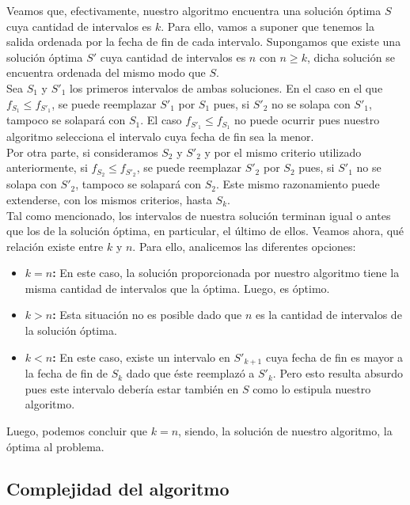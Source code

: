 Veamos que, efectivamente, nuestro algoritmo encuentra una solución óptima $S$ cuya cantidad de intervalos es $k$. Para ello, vamos a suponer que tenemos la salida ordenada por la fecha de fin de cada intervalo. Supongamos que existe una solución óptima $S'$ cuya cantidad de intervalos es $n$ con $n \geq k$, dicha solución se encuentra ordenada del mismo modo que $S$.\\ Sea $S_{1}$ y $S'_{1}$ los primeros intervalos de ambas soluciones. En el caso en el que $f_{S_{1}} \leq f_{S'_{1}}$, se puede reemplazar $S'_{1}$ por $S_{1}$ pues, si $S'_{2}$ no se solapa con $S'_{1}$, tampoco se solapará con $S_{1}$. El caso $f_{S'_{1}} \leq f_{S_{1}}$ no puede ocurrir pues nuestro algoritmo selecciona el intervalo cuya fecha de fin sea la menor.\\
Por otra parte, si consideramos $S_{2}$ y $S'_{2}$ y por el mismo criterio utilizado anteriormente, si $f_{S_{2}} \leq f_{S'_{2}}$, se puede reemplazar $S'_{2}$ por $S_{2}$ pues, si $S'_{1}$ no se solapa con $S'_{2}$, tampoco se solapará con $S_{2}$. Este mismo razonamiento puede extenderse, con los mismos criterios, hasta $S_{k}$.\\
Tal como mencionado, los intervalos de nuestra solución terminan igual o antes que los de la solución óptima, en particular, el último de ellos. Veamos ahora, qué relación existe entre $k$ y $n$. Para ello, analicemos las diferentes opciones:
\begin{itemize}
\item \textbf{$k = n$:} En este caso, la solución proporcionada por nuestro algoritmo tiene la misma cantidad de intervalos que la óptima. Luego, es óptimo.
\item \textbf{$k > n$:} Esta situación no es posible dado que $n$ es la cantidad de intervalos de la solución óptima.
\item \textbf{$k < n$:} En este caso, existe un intervalo en $S'_{k+1}$ cuya fecha de fin es mayor a la fecha de fin de $S_{k}$ dado que éste reemplazó a $S'_{k}$. Pero esto resulta absurdo pues este intervalo debería estar también en $S$ como lo estipula nuestro algoritmo.
\end{itemize}

Luego, podemos concluir que $k = n$, siendo, la solución de nuestro algoritmo, la óptima al problema. 

\subsection{Complejidad del algoritmo}

